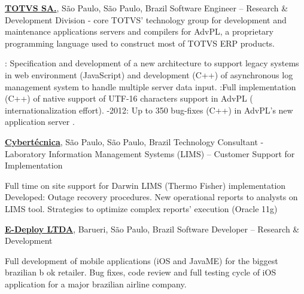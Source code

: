 \documentclass[letterpaper,MMMyyyy,nonstopmode]{simpleresumecv}
\begin{document}
\begin{Body}
\Entry
\href{http://www.totvs.com/}
{\textbf{TOTVS SA.}},
São Paulo, São Paulo, Brazil
\Gap
\BulletItem
Software Engineer
\hfill
{} --
\newline
Research \& Development Division - core TOTVS' technology group for development and maintenance applications servers and compilers for AdvPL, a proprietary programming language used to construct most of TOTVS ERP products.
\begin{Detail}
: Specification and development of a new architecture to support legacy systems in web environment (JavaScript) and development (C++) of asynchronous log management system to handle multiple server data input. 
:Full implementation (C++) of native support of UTF-16 characters support in AdvPL ( internationalization effort).
-2012: Up to 350 bug-fixes (C++) in AdvPL's new application server .  
\end{Detail}

\Entry
\href{http://www.http://cybertecnica.com.br/br/}
{\textbf{Cybertécnica}},
São Paulo, São Paulo, Brazil
\Gap
\BulletItem
Technology Consultant - Laboratory Information Management Systems (LIMS)
\hfill
{} --
\newline
Customer Support for Implementation 
\begin{Detail}

\SubBulletItem
Full time on site support for Darwin LIMS (Thermo Fisher) implementation 
\SubItem
Developed:
\SubBulletItem
Outage recovery procedures. 
\SubBulletItem
New operational reports to analysts on LIMS tool. 
\SubBulletItem
Strategies to optimize complex reports' execution (Oracle 11g)
\end{Detail}

\Entry
\href{http://www.e-deploy.com.br/}
{\textbf{E-Deploy LTDA}},
Barueri, São Paulo, Brazil
\Gap
\BulletItem
Software Developer
\hfill
{} --
\newline
Research \& Development
\begin{Detail}
\SubBulletItem
Full development of mobile applications (iOS and JavaME) for the biggest brazilian b ok retailer.  
\SubBulletItem
Bug fixes, code review and full testing cycle of iOS application for a major brazilian airline company.
\end{Detail}


\end{Body}
\end{document}
